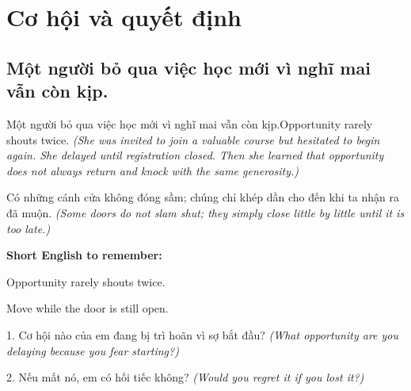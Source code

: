 \chapter{Cơ hội và quyết định}

\section{Một người bỏ qua việc học mới vì nghĩ mai vẫn còn kịp.}
\begin{truyen}{Một người bỏ qua việc học mới vì nghĩ mai vẫn còn kịp.}{Opportunity rarely shouts twice.}
\textit{(She was invited to join a valuable course but hesitated to begin again. She delayed until registration closed. Then she learned that opportunity does not always return and knock with the same generosity.)}
\end{truyen}
\begin{baihoc}
Có những cánh cửa không đóng sầm; chúng chỉ khép dần cho đến khi ta nhận ra đã muộn.
\textit{(Some doors do not slam shut; they simply close little by little until it is too late.)}
\end{baihoc}
\begin{ghinhoanh}
\textbf{Short English to remember:}

Opportunity rarely shouts twice.

Move while the door is still open.
\end{ghinhoanh}
\begin{tuhocnhanh}
1. Cơ hội nào của em đang bị trì hoãn vì sợ bắt đầu? \textit{(What opportunity are you delaying because you fear starting?)}

2. Nếu mất nó, em có hối tiếc không? \textit{(Would you regret it if you lost it?)}
\end{tuhocnhanh}
\ngancach


